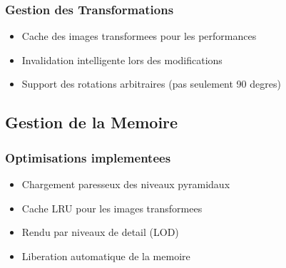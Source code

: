 \documentclass[12pt,a4paper]{article}
\begin{document}
\subsubsection{Gestion des Transformations}
\begin{itemize}
\item Cache des images transformees pour les performances
\item Invalidation intelligente lors des modifications
\item Support des rotations arbitraires (pas seulement 90 degres)
\end{itemize}

\subsection{Gestion de la Memoire}

\subsubsection{Optimisations implementees}
\begin{itemize}
\item Chargement paresseux des niveaux pyramidaux
\item Cache LRU pour les images transformees
\item Rendu par niveaux de detail (LOD)
\item Liberation automatique de la memoire
\end{itemize}
\end{document}
